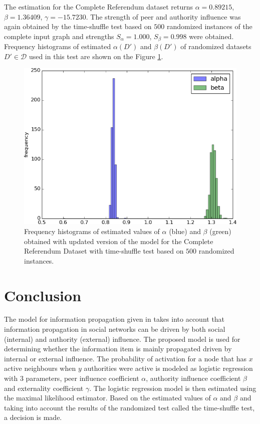 \documentclass[times, utf8, zavrsni]{fer}
\begin{document}
The estimation for the Complete Referendum dataset returns $\alpha=0.89215$, $\beta=1.36409$, $\gamma=-15.7230$. The strength of peer and authority influence was again obtained by the time-shuffle test based on $500$ randomized instances of the complete input graph and strengths $S_{\alpha} = 1.000$, $S_{\beta} = 0.998$ were obtained. Frequency histograms of estimated $\alpha(D')$ and $\beta(D')$ of randomized datasets $D' \in \mathcal{D}$ used in this test are shown on the Figure \ref{hist_full3}. 
\begin{figure}[htp]
\centering
\includegraphics[scale=0.7]{abg500v.png}	
\caption{Frequency histograms of estimated values of $\alpha$ (blue) and $\beta$ (green)  obtained with updated version of the model for the Complete Referendum Dataset with time-shuffle test based on $500$ randomized instances.}
\label{hist_full3}
\end{figure}

\chapter{Conclusion}

The model for information propagation given in \cite{authority} takes into account that information propagation in social networks can be driven by both social (internal) and authority (external) influence. The proposed model is used for determining whether the information item is mainly propagated driven by internal or external influence. The probability of activation for a node that has $x$ active neighbours when $y$ authorities were active is modeled as logistic regression with $3$ parameters, peer influence coefficient $\alpha$, authority influence coefficient $\beta$ and externality coefficient $\gamma$. The logistic regression model is then estimated using the maximal likelihood estimator. Based on the estimated values of $\alpha$ and $\beta$ and  taking into account the results of the randomized test called the time-shuffle test, a decision is made. 
\end{document}
